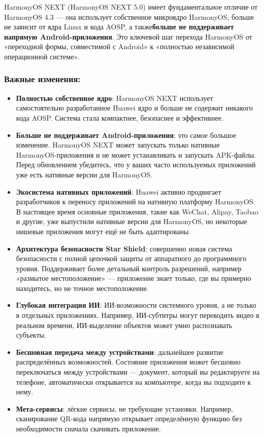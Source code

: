 
HarmonyOS NEXT (HarmonyOS NEXT 5.0) имеет фундаментальное отличие от HarmonyOS 4.3 — она использует собственное микроядро HarmonyOS, больше не зависит от ядра Linux и кода AOSP, а также\textbf{больше не поддерживает напрямую Android-приложения}. Это ключевой шаг перехода HarmonyOS от «переходной формы, совместимой с Android» к «полностью независимой операционной системе».

\subsubsection*{Важные изменения:}

\begin{itemize}
  \item \textbf{Полностью собственное ядро}: HarmonyOS NEXT использует самостоятельно разработанное Huawei ядро и больше не содержит никакого кода AOSP. Система стала компактнее, безопаснее и эффективнее.
  \item \textbf{Больше не поддерживает Android-приложения}: это самое большое изменение. HarmonyOS NEXT может запускать только нативные HarmonyOS-приложения и не может устанавливать и запускать APK-файлы. Перед обновлением убедитесь, что у ваших часто используемых приложений уже есть нативные версии для HarmonyOS.
  \item \textbf{Экосистема нативных приложений}: Huawei активно продвигает разработчиков к переносу приложений на нативную платформу HarmonyOS. В настоящее время основные приложения, такие как WeChat, Alipay, Taobao и другие, уже выпустили нативные версии для HarmonyOS, но некоторые нишевые приложения могут ещё не быть адаптированы.
  \item \textbf{Архитектура безопасности Star Shield}: совершенно новая система безопасности с полной цепочкой защиты от аппаратного до программного уровня. Поддерживает более детальный контроль разрешений, например «размытое местоположение» — приложение знает только, где вы примерно находитесь, но не точное местоположение.
  \item \textbf{Глубокая интеграция ИИ}: ИИ-возможности системного уровня, а не только в отдельных приложениях. Например, ИИ-субтитры могут переводить видео в реальном времени, ИИ-выделение объектов может умно распознавать субъекты.
  \item \textbf{Бесшовная передача между устройствами}: дальнейшее развитие распределённых возможностей. Состояние приложения может бесшовно переключаться между устройствами — документ, который вы редактируете на телефоне, автоматически открывается на компьютере, когда вы подходите к нему.
  \item \textbf{Мета-сервисы}: лёгкие сервисы, не требующие установки. Например, сканирование QR-кода напрямую открывает определённую функцию без необходимости сначала скачивать приложение.
\end{itemize}


